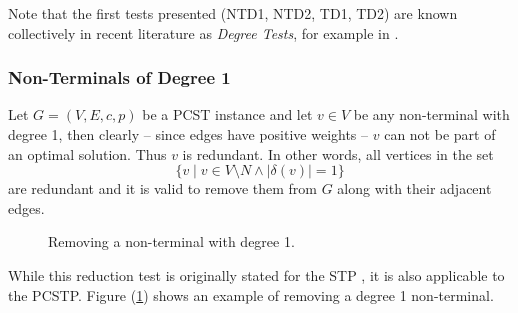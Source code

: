  Note that the first tests presented (NTD1, NTD2, TD1, TD2) are known collectively
 in recent literature as \textit{Degree Tests}, for example in \cite{rehfeldt2016reduction}.
\subsubsection{Non-Terminals of Degree 1}
\label{sec:red:test:deg1}
Let $G = (V, E, c, p)$ be a PCST instance and let $v \in V$ be any non-terminal with degree 1, then
 clearly -- since edges have positive weights -- $v$ can not be part of an optimal solution. Thus $v$ is redundant. In other words,
 all vertices in the set
 $$\{v \mid v \in V \setminus N \wedge |\delta(v)| = 1\}$$
 are redundant and it is valid to remove them from $G$ along with their adjacent edges.

\begin{figure}[h]\centering
  \caption{Removing a non-terminal with degree 1.}
  \label{fig:red:test:deg1}
\end{figure}

 While this reduction test is originally stated for the STP \citep{hwang1992steiner}, it is also applicable to the PCSTP. Figure (\ref{fig:red:test:deg1})
  shows an example of removing a degree 1 non-terminal.

